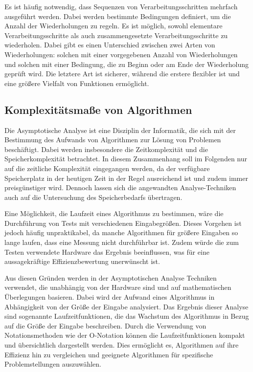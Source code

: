 Es ist häufig notwendig, dass Sequenzen von Verarbeitungsschritten mehrfach ausgeführt werden. Dabei werden bestimmte Bedingungen definiert, um die Anzahl der Wiederholungen zu regeln. Es ist möglich, sowohl elementare Verarbeitungsschritte als auch zusammengesetzte Verarbeitungsschritte zu wiederholen. Dabei gibt es einen Unterschied zwischen zwei Arten von Wiederholungen: solchen mit einer vorgegebenen Anzahl von Wiederholungen und solchen mit einer Bedingung, die zu Beginn oder am Ende der Wiederholung geprüft wird. Die letztere Art ist sicherer, während die erstere flexibler ist und eine größere Vielfalt von Funktionen ermöglicht. \autocite[13-14]{hubwieser_fundamente_2015}

\subsection{Komplexitätsmaße von Algorithmen} \label{o-notation}
Die Asymptotische Analyse ist eine Disziplin der Informatik, die sich mit der Bestimmung des Aufwands von Algorithmen zur Lösung von Problemen beschäftigt. Dabei werden insbesondere die Zeitkomplexität und die Speicherkomplexität betrachtet. In diesem Zusammenhang soll im Folgenden nur auf die zeitliche Komplexität eingegangen werden, da der verfügbare Speicherplatz in der heutigen Zeit in der Regel ausreichend ist und zudem immer preisgünstiger wird. Dennoch lassen sich die angewandten Analyse-Techniken auch auf die Untersuchung des Speicherbedarfs übertragen. \autocite[201]{hubwieser_fundamente_2015}

Eine Möglichkeit, die Laufzeit eines Algorithmus zu bestimmen, wäre die Durchführung von Tests mit verschiedenen Eingabegrößen. Dieses Vorgehen ist jedoch häufig unpraktikabel, da manche Algorithmen für größere Eingaben so lange laufen, dass eine Messung nicht durchführbar ist. Zudem würde die zum Testen verwendete Hardware das Ergebnis beeinflussen, was für eine aussagekräftige Effizienzbewertung unerwünscht ist.\autocite[201]{hubwieser_fundamente_2015}

Aus diesen Gründen werden in der Asymptotischen Analyse Techniken verwendet, die unabhängig von der Hardware sind und auf mathematischen Überlegungen basieren. Dabei wird der Aufwand eines Algorithmus in Abhängigkeit von der Größe der Eingabe analysiert. Das Ergebnis dieser Analyse sind sogenannte Laufzeitfunktionen, die das Wachstum des Algorithmus in Bezug auf die Größe der Eingabe beschreiben. Durch die Verwendung von Notationsmethoden wie der O-Notation können die Laufzeitfunktionen kompakt und übersichtlich dargestellt werden. Dies ermöglicht es, Algorithmen auf ihre Effizienz hin zu vergleichen und geeignete Algorithmen für spezifische Problemstellungen auszuwählen.\autocite[201-203]{hubwieser_fundamente_2015}


